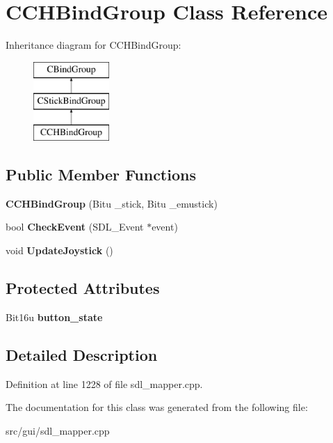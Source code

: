 \hypertarget{classCCHBindGroup}{\section{C\-C\-H\-Bind\-Group Class Reference}
\label{classCCHBindGroup}
}
Inheritance diagram for C\-C\-H\-Bind\-Group\-:\begin{figure}[H]
\begin{center}
\leavevmode
\includegraphics[height=3.000000cm]{classCCHBindGroup}
\end{center}
\end{figure}
\subsection*{Public Member Functions}
\begin{DoxyCompactItemize}
\item 
\hypertarget{classCCHBindGroup_a86bb3a7458f395324aae896cbe02f4dd}{{\bfseries C\-C\-H\-Bind\-Group} (Bitu \-\_\-stick, Bitu \-\_\-emustick)}\label{classCCHBindGroup_a86bb3a7458f395324aae896cbe02f4dd}

\item 
\hypertarget{classCCHBindGroup_a33b9f9ced9bf284c83219c33aa81bfe0}{bool {\bfseries Check\-Event} (S\-D\-L\-\_\-\-Event $\ast$event)}\label{classCCHBindGroup_a33b9f9ced9bf284c83219c33aa81bfe0}

\item 
\hypertarget{classCCHBindGroup_a11232134bcf2b6f8257f8103d34d2a13}{void {\bfseries Update\-Joystick} ()}\label{classCCHBindGroup_a11232134bcf2b6f8257f8103d34d2a13}

\end{DoxyCompactItemize}
\subsection*{Protected Attributes}
\begin{DoxyCompactItemize}
\item 
\hypertarget{classCCHBindGroup_a0d3a52894ed32833a5942a5b0e507c56}{Bit16u {\bfseries button\-\_\-state}}\label{classCCHBindGroup_a0d3a52894ed32833a5942a5b0e507c56}

\end{DoxyCompactItemize}


\subsection{Detailed Description}


Definition at line 1228 of file sdl\-\_\-mapper.\-cpp.



The documentation for this class was generated from the following file\-:\begin{DoxyCompactItemize}
\item 
src/gui/sdl\-\_\-mapper.\-cpp\end{DoxyCompactItemize}
